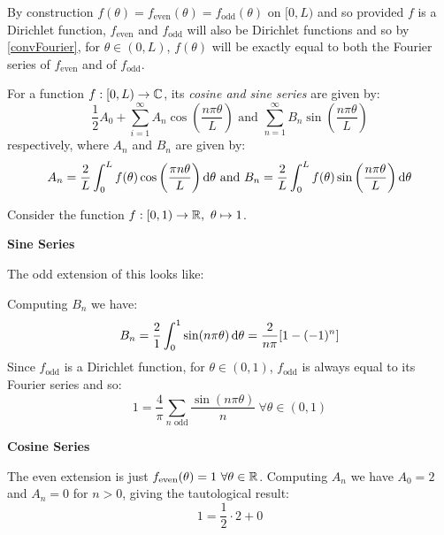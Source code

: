 \documentclass[../main.tex]{subfiles}
\begin{document}
By construction $f(\theta) = f_{\text{even}}(\theta) = f_{\text{odd}}(\theta)$ on $[0, L)$ and so provided $f$ is a Dirichlet function, $f_{\text{even}}$ and $f_{\text{odd}}$ will also be Dirichlet functions and so by \cref{convFourier}, for $\theta \in (0, L)$, $f(\theta)$ will be exactly equal to both the Fourier series of $f_{\text{even}}$ and of $f_{\text{odd}}$.
\begin{definition}
  For a function $f: [0, L) \to \mathbb{C}$, its \textit{cosine and sine series} are given by: \label{sinCosSeries}
  \[
    \frac{1}{2} A_0 + \sum_{i = 1}^{\infty} A_n \cos\left(\frac{n \pi \theta}{L}\right) \text{ and } \sum_{n = 1}^{\infty} B_n \sin\left(\frac{n \pi \theta}{L}\right)
  \]
  respectively, where $A_n$ and $B_n$ are given by:
  \[
    A_n = \frac{2}{L} \int_{0}^{L} f(\theta) \cos\left(\frac{\pi n \theta}{L}\right) \d{\theta} \text{ and } B_n = \frac{2}{L} \int_{0}^{L} f(\theta) \sin\left(\frac{n \pi \theta}{L}\right) \d{\theta}
  \]
\end{definition}
\begin{example}
  Consider the function $f: [0, 1) \to \R,\ \theta \mapsto 1$.

  \textbf{Sine Series}\par
  The odd extension of this looks like:
  \begin{center}
  \end{center}
  Computing $B_n$ we have:
  \[
    B_n = \frac{2}{1} \int_{0}^{1} \sin(n \pi \theta) \d{\theta} = \frac{2}{n \pi}[1 - (-1)^{n}]
  \]
  Since $f_{\text{odd}}$ is a Dirichlet function, for $\theta \in (0, 1)$, $f_{\text{odd}}$ is always equal to its Fourier series and so:
  \[
    1 = \frac{4}{\pi} \sum_{n \text{ odd}} \frac{\sin(n \pi \theta)}{n}\ \forall \theta \in (0, 1)
  \]

  \textbf{Cosine Series}\par
  The even extension is just $f_{\text{even}}(\theta) = 1\ \forall \theta \in \mathbb{R}$.
  Computing $A_n$ we have $A_0 = 2$ and $A_n = 0$ for $n > 0$, giving the tautological result:
  \[
    1 = \frac{1}{2} \cdot 2 + 0
  \]
\end{example}
\end{document}
